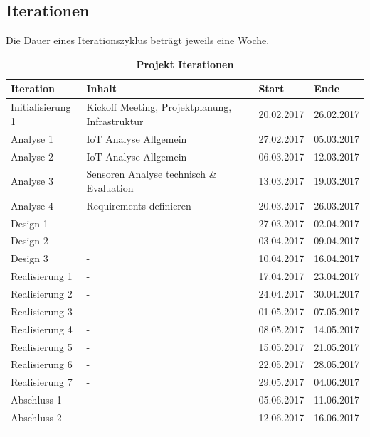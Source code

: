 \subsection{Iterationen}
Die Dauer eines Iterationszyklus beträgt jeweils eine Woche. 
\begin{table}[htb]
\centering
    \begin{tabular}{@{} p{3cm} l l l@{}}\toprule    
    {Iteration} & {Inhalt} & {Start} & {Ende}\\ \midrule
    Initialisierung 1 & Kickoff Meeting, Projektplanung, Infrastruktur & 20.02.2017 & 26.02.2017\\
    Analyse 1 & IoT Analyse Allgemein & 27.02.2017 & 05.03.2017\\ \addlinespace
    Analyse 2 & IoT Analyse Allgemein & 06.03.2017 & 12.03.2017\\ \addlinespace
    Analyse 3 & Sensoren Analyse technisch \& Evaluation & 13.03.2017 & 19.03.2017\\ \addlinespace
    Analyse 4 & Requirements definieren & 20.03.2017 & 26.03.2017\\ \addlinespace
    Design 1 & - & 27.03.2017 & 02.04.2017\\ \addlinespace
    Design 2 & - & 03.04.2017  & 09.04.2017\\ \addlinespace
    Design 3 & - & 10.04.2017  & 16.04.2017\\ \addlinespace
    Realisierung 1 & - & 17.04.2017  & 23.04.2017\\ \addlinespace
    Realisierung 2 & - & 24.04.2017  & 30.04.2017\\ \addlinespace
    Realisierung 3 & - & 01.05.2017  & 07.05.2017\\ \addlinespace
    Realisierung 4 & - & 08.05.2017  & 14.05.2017\\ \addlinespace
    Realisierung 5 & - & 15.05.2017  & 21.05.2017\\ \addlinespace
    Realisierung 6 & - & 22.05.2017  & 28.05.2017\\ \addlinespace
    Realisierung 7 & - & 29.05.2017  & 04.06.2017\\ \addlinespace
    Abschluss 1 & - &  05.06.2017 & 11.06.2017\\ \addlinespace
    Abschluss 2 & - &  12.06.2017 & 16.06.2017\\ \addlinespace
    \bottomrule
    \end{tabular}
\caption{\textbf{Projekt Iterationen}}
\end{table}


